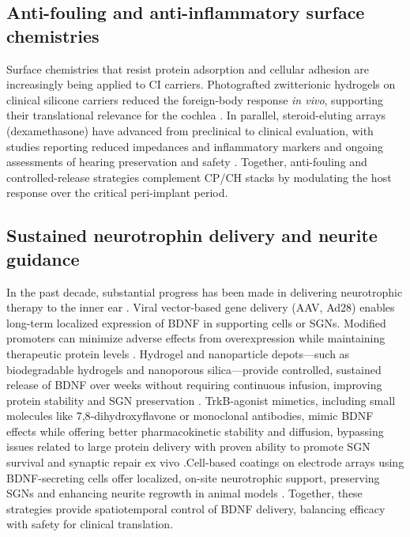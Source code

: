 \documentclass[referee,pdflatex, sn-vancouver-num]{sn-jnl}%
\theoremstyle{thmstyleone}%
\theoremstyle{thmstyletwo}%
\theoremstyle{thmstylethree}%
\begin{document}
\subsection{Anti-fouling and anti-inflammatory surface chemistries}
Surface chemistries that resist protein adsorption and cellular adhesion are increasingly being applied to CI carriers. Photografted zwitterionic hydrogels on clinical silicone carriers reduced the foreign-body response \textit{in vivo}, supporting their translational relevance for the cochlea \cite{Horne2023}. In parallel, steroid-eluting arrays (dexamethasone) have advanced from preclinical to clinical evaluation, with studies reporting reduced impedances and inflammatory markers and ongoing assessments of hearing preservation and safety \cite{Kiefer2008Dexameth,Briggs2020,xu2018,Rahman2024,Toulemonde2021}. Together, anti-fouling and controlled-release strategies complement CP/CH stacks by modulating the host response over the critical peri-implant period.

\subsection{Sustained neurotrophin delivery and neurite guidance}
In the past decade, substantial progress has been made in delivering neurotrophic therapy to the inner ear \cite{StPeter2022}. Viral vector‑based gene delivery (AAV, Ad28) enables long-term localized expression of BDNF in supporting cells or SGNs. Modified promoters can minimize adverse effects from overexpression while maintaining therapeutic protein levels \cite{Leake2019, Mukherjee2022}. Hydrogel and nanoparticle depots—such as biodegradable hydrogels and nanoporous silica—provide controlled, sustained release of BDNF over weeks without requiring continuous infusion, improving protein stability and SGN preservation \cite{Wise2016, Yu2024}. TrkB‑agonist mimetics, including small molecules like 7,8‑dihydroxyflavone or monoclonal antibodies, mimic BDNF effects while offering better pharmacokinetic stability and diffusion, bypassing issues related to large protein delivery with proven ability to promote SGN survival and synaptic repair ex vivo \cite{Szobota2019}.Cell-based coatings on electrode arrays using BDNF-secreting cells offer localized, on-site neurotrophic support, preserving SGNs and enhancing neurite regrowth in animal models \cite{Scheper2019}. Together, these strategies provide spatiotemporal control of BDNF delivery, balancing efficacy with safety for clinical translation.
\end{document}
